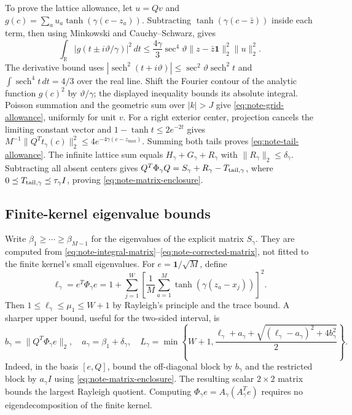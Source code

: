 To prove the lattice allowance, let $u=Qv$ and
$g(c)=\sum_a u_a\tanh(\gamma(c-z_a))$. Subtracting
$\tanh(\gamma(c-\bar z))$ inside each term, then using Minkowski and
Cauchy--Schwarz, gives
\[
 \int_{\mathbb R}|g(t\pm i\vartheta/\gamma)|^2\,dt
 \le\frac{4\gamma}{3}\sec^4\vartheta
 \|z-\bar z\mathbf1\|_2^2\|u\|_2^2.
\]
The derivative bound uses
$|\operatorname{sech}^2(t+i\vartheta)|\le
\sec^2\vartheta\operatorname{sech}^2t$ and
$\int\operatorname{sech}^4t\,dt=4/3$ over the real line.
Shift the Fourier contour of the analytic function $g(c)^2$ by
$\vartheta/\gamma$; the displayed inequality bounds its absolute integral.
Poisson summation and the geometric sum over $|k|>J$ give
\eqref{eq:note-grid-allowance}, uniformly for unit $v$.
For a right exterior center, projection cancels the limiting constant
vector and $1-\tanh t\le2e^{-2t}$ gives
$M^{-1}\|Q^Tt_\gamma(c)\|_2^2\le4e^{-4\gamma(c-z_{\max})}$.
Summing both tails proves \eqref{eq:note-tail-allowance}.
The infinite lattice sum equals $H_\gamma+G_\gamma+R_\gamma$ with
$\|R_\gamma\|_2\le\delta_\gamma$. Subtracting all absent centers gives
$Q^T\Phi_\gamma Q=S_\gamma+R_\gamma-T_{\rm tail,\gamma}$,
where $0\preceq T_{\rm tail,\gamma}\preceq\tau_\gamma I$, proving
\eqref{eq:note-matrix-enclosure}.

\subsection{Finite-kernel eigenvalue bounds}
Write $\beta_1\ge\cdots\ge\beta_{M-1}$ for the eigenvalues of the
explicit matrix $S_\gamma$. They are computed from
\eqref{eq:note-integral-matrix}--\eqref{eq:note-corrected-matrix},
not fitted to the finite kernel's small eigenvalues.
For $e=\mathbf1/\sqrt M$, define
\begin{equation}
 \ell_\gamma=e^T\Phi_\gamma e
 =1+\sum_{j=1}^W\left[\frac1M\sum_{a=1}^M
 \tanh(\gamma(z_a-x_j))\right]^2.
 \label{eq:note-top-lower}
\end{equation}
Then $1\le\ell_\gamma\le\mu_1\le W+1$ by Rayleigh's principle and the
trace bound. A sharper upper bound, useful for the two-sided interval, is
\begin{equation}
 b_\gamma=\|Q^T\Phi_\gamma e\|_2,\quad
 a_\gamma=\beta_1+\delta_\gamma,\quad
 L_\gamma=\min\!\left\{W+1,
 \frac{\ell_\gamma+a_\gamma+
 \sqrt{(\ell_\gamma-a_\gamma)^2+4b_\gamma^2}}2\right\}.
 \label{eq:note-top-upper}
\end{equation}
Indeed, in the basis $[e,Q]$, bound the off-diagonal block by $b_\gamma$
and the restricted block by $a_\gamma I$ using
\eqref{eq:note-matrix-enclosure}. The resulting scalar $2\times2$
matrix bounds the largest Rayleigh quotient. Computing
$\Phi_\gamma e=A_\gamma(A_\gamma^Te)$ requires no eigendecomposition
of the finite kernel.

